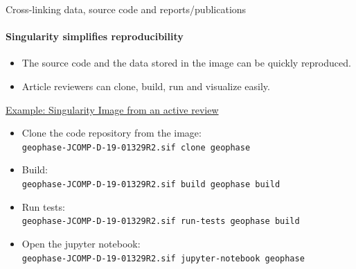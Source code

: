 \documentclass[
	aspectratio=169,%
	color={accentcolor=2d},
	logo=true,%
	colorframetitle=true,%
	]{tudabeamer}
\begin{document}
\begin{frame}{Cross-linking data, source code and reports/publications} 
    \framesubtitle{Singularity simplifies reproducibility}

    \begin{itemize}
        \item The source code and the data stored in the image can be quickly reproduced.
        \item Article reviewers can clone, build, run and visualize easily. 
    \end{itemize}

    \href{https://git.rwth-aachen.de/leia/geophase/-/blob/JCOMP-D-19-01329R2/geophase.def}{Example: Singularity Image from an active review}
    \begin{itemize}
        \item Clone the code repository from the image: \\ \texttt{geophase-JCOMP-D-19-01329R2.sif clone geophase}
        \item Build: \\ \texttt{geophase-JCOMP-D-19-01329R2.sif build geophase build}
        \item Run tests: \\ \texttt{geophase-JCOMP-D-19-01329R2.sif run-tests geophase build}
        \item Open the jupyter notebook: \\ \texttt{geophase-JCOMP-D-19-01329R2.sif jupyter-notebook geophase}
    \end{itemize}

\end{frame}


	
\end{document}

